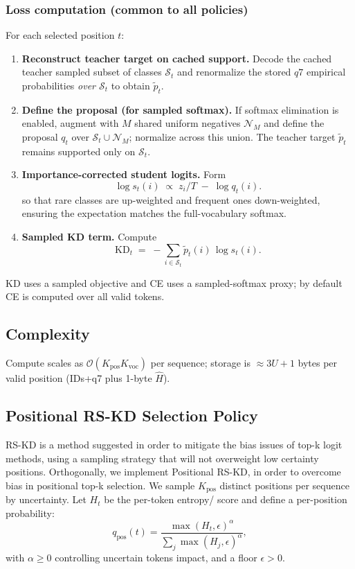 \documentclass[11pt]{article}
\begin{document}
\subsubsection{Loss computation (common to all policies)}
For each selected position $t$:
\begin{enumerate}
	\item \textbf{Reconstruct teacher target on cached support.} Decode the cached teacher sampled subset of classes $\mathcal{S}_t$ and renormalize the stored $q7$ empirical probabilities \emph{over $\mathcal{S}_t$} to obtain $\tilde p_t$.
	\item \textbf{Define the proposal (for sampled softmax).} If softmax elimination is enabled, augment with $M$ shared uniform negatives $\mathcal{N}_M$ and define the proposal $q_t$ over $\mathcal{S}_t\cup\mathcal{N}_M$; normalize across this union. The teacher target $\tilde p_t$ remains supported only on $\mathcal{S}_t$.
	\item \textbf{Importance-corrected student logits.} Form
	      \[
		      \log s_t(i)\;\propto\; z_i/T \;-\; \log q_t(i).
	      \]
	      so that rare classes are up-weighted and frequent ones down-weighted,
	      ensuring the expectation matches the full-vocabulary softmax.
	\item \textbf{Sampled KD term.} Compute
	      \[
		      \mathrm{KD}_t \;=\; -\!\sum_{i\in\mathcal{S}_t} \tilde p_t(i)\,\log s_t(i).
	      \]
\end{enumerate}
KD uses a sampled objective and CE uses a sampled-softmax proxy; by default CE is computed over all valid tokens.

\subsection{Complexity}
Compute scales as $\mathcal{O}(K_{\text{pos}}K_{\text{voc}})$ per sequence; storage is $\approx 3U + 1$ bytes per valid position (IDs+q7 plus 1-byte $\hat H$).

\subsection{Positional RS-KD Selection Policy}
RS-KD is a method suggested in order to mitigate the bias issues of top-k logit methods, using a sampling strategy that will not overweight low certainty positions. Orthogonally, we implement Positional RS-KD, in order to overcome bias in positional top-k selection. We sample $K_{\text{pos}}$ distinct positions per sequence by uncertainty. Let $H_t$ be the per-token entropy/ score and define a per-position probability:
\[
	q_{\text{pos}}(t)=\frac{\max(H_t,\epsilon)^{\alpha}}{\sum_j \max(H_j,\epsilon)^{\alpha}},
\]
with $\alpha\ge0$ controlling uncertain tokens impact, and a floor $\epsilon>0$.
\end{document}
